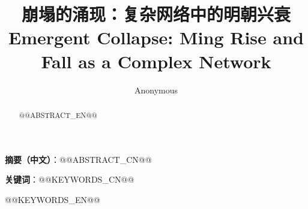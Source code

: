 \documentclass[conference]{IEEEtran}
\title{崩塌的涌现：复杂网络中的明朝兴衰\\[2pt]
\large Emergent Collapse: Ming Rise and Fall as a Complex Network}
\author{Anonymous}
\date{}
\begin{document}
\maketitle

\noindent\textbf{摘要（中文）}：@@ABSTRACT_CN@@

\noindent\textbf{关键词}：@@KEYWORDS_CN@@

\vspace{6pt}
\begin{abstract}
@@ABSTRACT_EN@@
\end{abstract}

\begin{IEEEkeywords}
@@KEYWORDS_EN@@
\end{IEEEkeywords}











\end{document}
